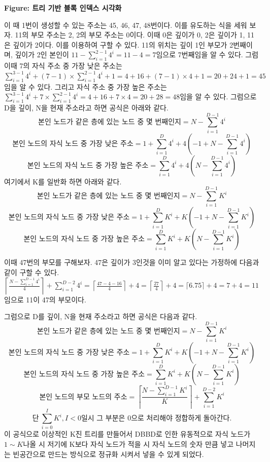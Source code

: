 \documentclass{book}
\begin{document}
\begin{landscape}
\begin{center}
\begin{tikzpicture}
\end{tikzpicture}

\vspace{1em}
\textbf{Figure: 트리 기반 블록 인덱스 시각화}
\end{center}

이 때 1번이 생성할 수 있는 주소는 45, 46, 47, 48번이다. 이를 유도하는 식을 세워 보자. 
11의 부모 주소는 2, 2의 부모 주소는 0이다. 이때 0은 깊이가 0, 2은 깊이가 1, 11은 깊이가 2이다. 이를 이용하여 구할 수 있다. 11의 위치는 깊이 1인 부모가 2번째이며, 깊이가 2인 본인이 $11 - \sum_{i=1}^{2-1} 4^i = 11 - 4 = 7$임으로 7번째임을 알 수 있다. 그럼 이때 7의 자식 주소 중 가장 낮은 주소는 $\sum_{i=1}^{3-1} 4^i + (7-1) \times \sum_{i=1}^{2-1} 4^i + 1=4+16+(7-1)\times4+1=20+24+1=45$임을 알 수 있다. 그리고 자식 주소 중 가장 높은 주소는 $\sum_{i=1}^{3-1} 4^i + 7 \times \sum_{i=1}^{2-1} 4^i=4+16+7\times4=20+28=48$임을 알 수 있다.
\newline\newline
그럼으로 D을 깊이, N을 현재 주소라고 하면 공식은 아래와 같다.
\[
\text{본인 노드가 같은 층에 있는 노드 중 몇 번째인지}=N - \sum_{i=1}^{D-1} 4^i
\]
\[
\text{본인 노드의 자식 노드 중 가장 낮은 주소}=1+\sum_{i=1}^{D} 4^i + 4 \left(-1 + N - \sum_{i=1}^{D-1} 4^i \right)
\]
\[
\text{본인 노드의 자식 노드 중 가장 높은 주소}=\sum_{i=1}^{D} 4^i + 4 \left(N - \sum_{i=1}^{D-1} 4^i \right)
\]
여기에서 K를 일반화 하면 아래와 같다.
\[
\text{본인 노드가 같은 층에 있는 노드 중 몇 번째인지}=N - \sum_{i=1}^{D-1} K^i
\]
\[
\text{본인 노드의 자식 노드 중 가장 낮은 주소}=1+\sum_{i=1}^{D} K^i + K \left(-1 + N - \sum_{i=1}^{D-1} K^i \right)
\]
\[
\text{본인 노드의 자식 노드 중 가장 높은 주소}=\sum_{i=1}^{D} K^i + K \left(N - \sum_{i=1}^{D-1} K^i \right)
\]

이때 47번의 부모를 구해보자. 47은 깊이가 3인것을 이미 알고 있다는 가정하에 다음과 같이 구할 수 있다. $\left \lceil \frac{N - \sum_{i=1}^{D-1} 4^i}{4} \right \rceil + \sum_{i=1}^{D-2} 4^i = \left \lceil \frac{47 - 4 - 16}{4} \right \rceil + 4 = \left \lceil \frac{27}{4} \right \rceil + 4 = \lceil 6.75 \rceil + 4= 7 + 4 = 11$임으로 11이 47의 부모이다.

\end{landscape}

그럼으로 D를 깊이, N을 현재 주소라고 하면 공식은 다음과 같다.
\[
\text{본인 노드가 같은 층에 있는 노드 중 몇 번째인지}=N - \sum_{i=1}^{D-1} K^i
\]
\[
\text{본인 노드의 자식 노드 중 가장 낮은 주소}=1+\sum_{i=1}^{D} K^i + K \left(-1 + N - \sum_{i=1}^{D-1} K^i \right)
\]
\[
\text{본인 노드의 자식 노드 중 가장 높은 주소}=\sum_{i=1}^{D} K^i + K \left(N - \sum_{i=1}^{D-1} K^i \right)
\]
\[
\text{본인 노드의 부모 노드의 주소}=\left \lceil \frac{N - \sum_{i=1}^{D-1} K^i}{K} \right \rceil + \sum_{i=1}^{D-2} K^i
\]
\[
\text{단}~\sum_{i=0}^{I} K^i, I < 0 \text{일시 그 부분은 0으로 처리해야 정합하게 돌아간다.}
\]
이 공식으로 이상적인 K진 트리를 만들어서 DBBD로 인한 유동적으로 자식 노드가 $1 \sim K$나올 시 저기에 K보다 자식 노드가 적을 시 자식 노드의 숫자 만큼 넣고 나머지는 빈공간으로 만드는 방식으로 정규화 시켜서 넣을 수 있게 되었다.
\end{document}
